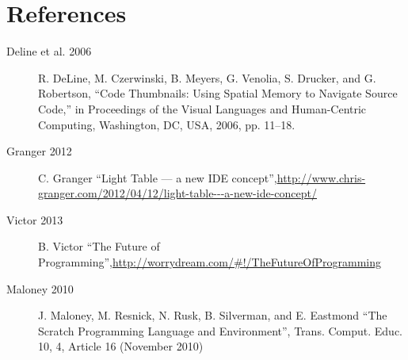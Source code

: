 \documentclass{scrartcl}
\begin{document}

\section*{References}

\begin{description}
  \item[Deline et al. 2006] R. DeLine, M. Czerwinski, B. Meyers, G. Venolia, S. Drucker, and G. Robertson, ``Code Thumbnails: Using Spatial Memory to Navigate Source Code,'' in Proceedings of the Visual Languages and Human-Centric Computing, Washington, DC, USA, 2006, pp. 11–18.
  \item[Granger 2012] C. Granger ``Light Table --- a new IDE concept'',\url{http://www.chris-granger.com/2012/04/12/light-table---a-new-ide-concept/}
  \item[Victor 2013] B. Victor ``The Future of Programming'',\url{http://worrydream.com/#!/TheFutureOfProgramming}
  \item[Maloney 2010] J. Maloney, M. Resnick, N. Rusk, B. Silverman, and E. Eastmond ``The Scratch Programming Language and Environment'', Trans. Comput. Educ. 10, 4, Article 16 (November 2010)
\end{description}
\end{document}
